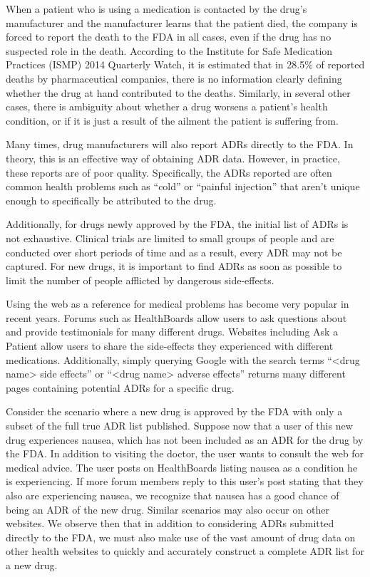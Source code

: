 \documentclass{acm_proc_article-sp}
\begin{document}
When a patient who is using a medication is contacted by the drug's manufacturer and the manufacturer learns that the patient died, the company is forced to report the death to the FDA in all cases, even if the drug has no suspected role in the death.  According to the Institute for Safe Medication Practices (ISMP) 2014 Quarterly Watch, it is estimated that in 28.5\% of reported deaths by pharmaceutical companies, there is no information clearly defining whether the drug at hand contributed to the deaths. Similarly, in several other cases, there is ambiguity about whether a drug worsens a patient's health condition, or if it is just a result of the ailment the patient is suffering from. 

Many times, drug manufacturers will also report ADRs directly to the FDA. In theory, this is an effective way of obtaining ADR data. However, in practice, these reports are of poor quality. Specifically, the ADRs reported are often common health problems such as ``cold'' or ``painful injection'' that aren't unique enough to specifically be attributed to the drug.

Additionally, for drugs newly approved by the FDA, the initial list of ADRs is not exhaustive. Clinical trials are limited to small groups of people and are conducted over short periods of time and as a result, every ADR may not be captured. For new drugs, it is important to find ADRs as soon as possible to limit the number of people afflicted by dangerous side-effects.

Using the web as a reference for medical problems has become very popular in recent years. Forums such as HealthBoards allow users to ask questions about and provide testimonials for many different drugs. Websites including Ask a Patient allow users to share the side-effects they experienced with different medications. Additionally, simply querying Google with the search terms ``<drug name> side effects'' or ``<drug name> adverse effects'' returns many different pages containing potential ADRs for a specific drug. 

Consider the scenario where a new drug is approved by the FDA with only a subset of the full true ADR list published. Suppose now that a user of this new drug experiences nausea, which has not been included as an ADR for the drug by the FDA. In addition to visiting the doctor, the user wants to consult the web for medical advice. The user posts on HealthBoards listing nausea as a condition he is experiencing. If more forum members reply to this user's post stating that they also are experiencing nausea, we recognize that nausea has a good chance of being an ADR of the new drug. Similar scenarios may also occur on other websites. We observe then that in addition to considering ADRs submitted directly to the FDA, we must also make use of the vast amount of drug data on other health websites to quickly and accurately construct a complete ADR list for a new drug.
\end{document}
